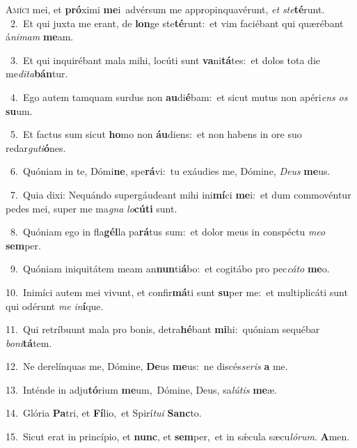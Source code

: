 \lettrine{\initial\textcolor{\initialcolor}{A}}{míci} mei, et \textbf{pró}\-ximi \textbf{me}\-i~\star advérsum me appropinquavérunt, \textit{et} \textit{ste}\-\textbf{té}runt.\\
{\numbfont\textcolor{\numbcolor}{~2.}}~Et qui juxta me erant, de \textbf{lon}\-ge ste\-\textbf{té}\-runt:~\star et vim faciébant qui quærébant á\-\textit{ni}\-\textit{mam} \textbf{me}\-am.\par
{\numbfont\textcolor{\numbcolor}{~3.}}~Et qui inquirébant mala mihi, locúti sunt \textbf{va}\-ni\-\textbf{tá}\-tes:~\star et dolos tota die me\-\textit{di}\-\textit{ta}\textbf{bán}tur.\par
{\numbfont\textcolor{\numbcolor}{~4.}}~Ego autem tamquam surdus non \textbf{au}\-di\-\textbf{é}\-bam:~\star et sicut mutus non apéri\textit{ens} \textit{os} \textbf{su}\-um.\par
{\numbfont\textcolor{\numbcolor}{~5.}}~Et factus sum sicut \textbf{ho}\-mo non \textbf{áu}\-diens:~\star et non habens in ore suo redar\-\textit{gu}\-\textit{ti}\textbf{ó}nes.\par
{\numbfont\textcolor{\numbcolor}{~6.}}~Quóniam in te, Dómi\-\textbf{ne}\-, spe\-\textbf{rá}\-vi:~\star tu exáudies me, Dómine, \textit{De}\-\textit{us} \textbf{me}\-us.\par
{\numbfont\textcolor{\numbcolor}{~7.}}~Quia dixi: Nequándo supergáudeant mihi ini\-\textbf{mí}\-ci \textbf{me}\-i:~\star et dum commovéntur pedes mei, super me ma\textit{gna} \textit{lo}\-\textbf{cú}\textbf{ti} sunt.\par
{\numbfont\textcolor{\numbcolor}{~8.}}~Quóniam ego in fla\-\textbf{gél}\-la pa\-\textbf{rá}\-tus sum:~\star et dolor meus in conspéctu \textit{me}\-\textit{o} \textbf{sem}\-per.\par
{\numbfont\textcolor{\numbcolor}{~9.}}~Quóniam iniquitátem meam an\-\textbf{nun}\-ti\-\textbf{á}\-bo:~\star et cogitábo pro pec\-\textit{cá}\-\textit{to} \textbf{me}\-o.\par
{\numbfont\textcolor{\numbcolor}{10.}}~Inimíci autem mei vivunt, et confir\-\textbf{má}\-ti sunt \textbf{su}\-per me:~\star et multiplicáti sunt qui odérunt \textit{me} \textit{in}\-\textbf{í}que.\par
{\numbfont\textcolor{\numbcolor}{11.}}~Qui retríbuunt mala pro bonis, detra\-\textbf{hé}\-bant \textbf{mi}\-hi:~\star quóniam sequébar \textit{bo}\-\textit{ni}\textbf{tá}tem.\par
{\numbfont\textcolor{\numbcolor}{12.}}~Ne derelínquas me, Dómine, \textbf{De}\-us \textbf{me}\-us:~\star ne discés\-\textit{se}\-\textit{ris} \textbf{a} me.\par
{\numbfont\textcolor{\numbcolor}{13.}}~Inténde in adju\-\textbf{tó}\-rium \textbf{me}\-um,~\star Dómine, Deus, sa\-\textit{lú}\-\textit{tis} \textbf{me}\-æ.\par
{\numbfont\textcolor{\numbcolor}{14.}}~Glória \textbf{Pa}\-tri, et \textbf{Fí}\-lio,~\star et Spirí\-\textit{tu}\-\textit{i} \textbf{Sanc}\-to.\par
{\numbfont\textcolor{\numbcolor}{15.}}~Sicut erat in princípio, et \textbf{nunc}\-, et \textbf{sem}\-per,~\star et in sǽcula sæcu\-\textit{ló}\-\textit{rum}. \textbf{A}\-men.\par
